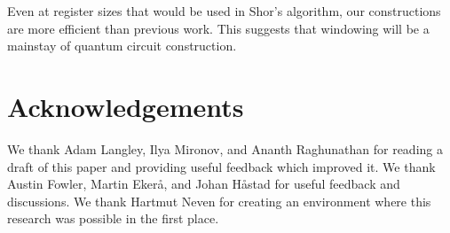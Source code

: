 \documentclass[onecolumn,unpublished]{quantumarticle}
\theoremstyle{definition}
\theoremstyle{definition}
\theoremstyle{definition}
\begin{document}
Even at register sizes that would be used in Shor's algorithm, our constructions are more efficient than previous work.
This suggests that windowing will be a mainstay of quantum circuit construction.


\section{Acknowledgements}
We thank Adam Langley, Ilya Mironov, and Ananth Raghunathan for reading a draft of this paper and providing useful feedback which improved it.
We thank Austin Fowler, Martin Ekerå, and Johan Håstad for useful feedback and discussions.
We thank Hartmut Neven for creating an environment where this research was possible in the first place.



\end{document}
